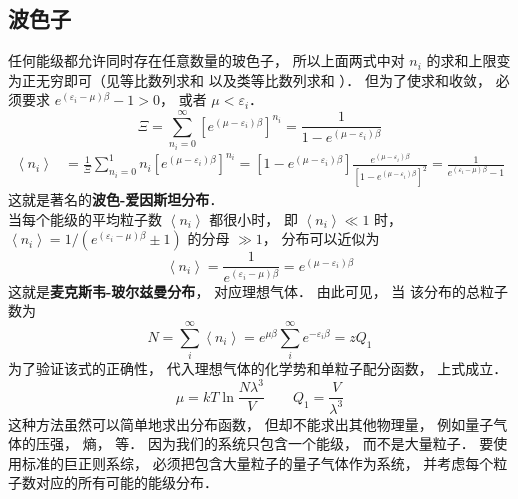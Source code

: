 \subsection{波色子} 
任何能级都允许同时存在任意数量的玻色子， 所以上面两式中对 ${n_i}$ 的求和上限变为正无穷即可（见等比数列求和%
以及类等比数列求和%
）． 但为了使求和收敛， 必须要求 ${e^{\left( {{\varepsilon _i} - \mu } \right)\beta }} - 1 > 0$，  或者 $\mu  < {\varepsilon _i}$． 
\begin{equation}
  \Xi  = \sum\limits_{{n_i} = 0}^\infty  {{{\left[ {{e^{\left( {\mu  - {\varepsilon _i}} \right)\beta }}} \right]}^{{n_i}}}}  = \frac{1}{{1 - {e^{\left( {\mu  - {\varepsilon _i}} \right)\beta }}}}
\end{equation}
\begin{equation}
\begin{aligned}
  \left\langle {{n_i}} \right\rangle & = \frac{1}{\Xi }\sum\limits_{{n_i} = 0}^1 {{n_i}{{\left[ {{e^{\left( {\mu  - {\varepsilon _i}} \right)\beta }}} \right]}^{{n_i}}}} = \left[ {1 - {e^{\left( {\mu  - {\varepsilon _i}} \right)\beta }}} \right]\frac{{{e^{\left( {\mu  - {\varepsilon _i}} \right)\beta }}}}{{{{\left[ {1 - {e^{\left( {\mu  - {\varepsilon _i}} \right)\beta }}} \right]}^2}}}  = \frac{1}{{{e^{\left( {{\varepsilon _i} - \mu } \right)\beta }} - 1}}
  \end{aligned}
\end{equation}
这就是著名的\textbf{波色-爱因斯坦分布}．\\
当每个能级的平均粒子数 $\left\langle {{n_i}} \right\rangle $ 都很小时， 即 $\left\langle {{n_i}} \right\rangle \ll 1$ 时， $\left\langle {{n_i}} \right\rangle  = {1}/({{{e^{\left( {{\varepsilon _i} - \mu } \right)\beta }} \pm 1}})$ 的分母 $ \gg 1$，  分布可以近似为
\begin{equation}
  \left\langle {{n_i}} \right\rangle  = \frac{1}{{{e^{\left( {{\varepsilon _i} - \mu } \right)\beta }}}} = {e^{\left( {\mu  - {\varepsilon _i}} \right)\beta }}
\end{equation}
这就是\textbf{麦克斯韦-玻尔兹曼分布}， 对应理想气体． 由此可见， 当 %
该分布的总粒子数为
\begin{equation}
  N = \sum\limits_i^\infty  {\left\langle {{n_i}} \right\rangle }  = {e^{\mu \beta }}\sum\limits_i^\infty  {{e^{ - {\varepsilon _i}\beta }}}  = z{Q_1}
\end{equation}
为了验证该式的正确性， 代入理想气体的化学势和单粒子配分函数， 上式成立．
\begin{equation}
  \mu  = kT\ln \frac{{N{\lambda ^3}}}{V} 
  \qquad
  {Q_1} = \frac{V}{{{\lambda ^3}}}
\end{equation}
这种方法虽然可以简单地求出分布函数， 但却不能求出其他物理量， 例如量子气体的压强， 熵， 等． 因为我们的系统只包含一个能级， 而不是大量粒子． 要使用标准的巨正则系综， 必须把包含大量粒子的量子气体作为系统， 并考虑每个粒子数对应的所有可能的能级分布．\\